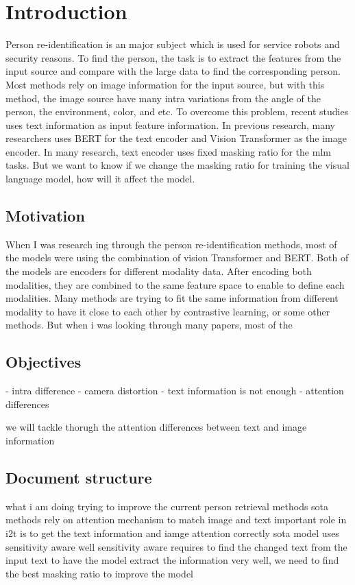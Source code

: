 \chapter{Introduction}
Person re-identification is an major subject which is used for service robots and security reasons. 
To find the person, the task is to extract the features from the input source and compare with the large data to find the corresponding person. Most methods rely on image information for the input source,%
 but with this method, the image source have many intra variations from the angle of the person, the environment, color, and etc.
To overcome this problem, recent studies uses text information as input feature information. 
In previous research, many researchers uses BERT for the text encoder and Vision Transformer as the image encoder. In many research, text encoder uses fixed masking ratio for the mlm tasks. But we want to know if we change the masking ratio for training the visual language model, how will it affect the model. 

\section{Motivation}
When I was research ing through the person re-identification methods, most of the models were using the combination of vision Transformer and BERT. Both of the models are encoders for different modality data. After encoding both modalities, they are combined to the same feature space to enable to define each modalities. Many methods are trying to fit the same information from different modality to have it close to each other by contrastive learning, or some other methods. %
But when i was looking through many papers, most of the 

\section{Objectives}
- intra difference
- camera distortion
- text information is not enough
- attention differences

we will tackle thorugh the attention differences between text and image information

\section{Document structure}

what i am doing 
trying to improve the current person retrieval methods
sota methods rely on attention mechanism to match image and text 
important role in i2t is to get the text information and iamge attention correctly 
sota model uses sensitivity aware well 
sensitivity aware requires to find the changed text from the input text 
to have the model extract the information very well, we need to find the best masking ratio to improve the model
